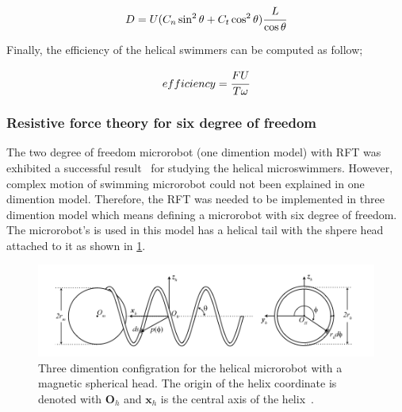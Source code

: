 \documentclass[12pt,a4paper,titlepage]{report}
\begin{document}
\begin{equation}
 D = U (C_n \sin ^2 \theta + C_t \cos ^2 \theta) \cfrac{L}{\cos \theta} 
\label{drag}
\end{equation}



Finally, the efficiency of the helical swimmers can be computed as follow;



\begin{equation}
 efficiency = \cfrac{FU}{T \omega} 
\label{efficiency}
\end{equation}

 
\subsubsection{Resistive force theory for six degree of freedom}\label{RFT_sixDegree}
 



The two degree of freedom microrobot (one dimention model) with \ac*{RFT} was exhibited a successful result~\citep{mahoney2011velocity}
for studying the helical microswimmers. However, complex motion of swimming microrobot could not been 
explained in one dimention model. Therefore, the \ac*{RFT} was needed to be implemented in three dimention
model which means defining a microrobot with six degree of freedom. The microrobot\rq{}s is
used in this model has a helical tail with the shpere head attached to it as shown in \ref{RFT-6dof}.

\begin{figure}
  \centering
    \includegraphics[width=1.0\textwidth]{RFT-6dof}
  \caption{Three dimention configration for the helical microrobot with a magnetic spherical head. The origin
of the helix coordinate is denoted with $\bm{O}_h$ and $\bm{x}_{h}$ is the central axis of the
 helix~\citep{mahoney2011velocity}.}
  \label{RFT-6dof}
\end{figure}
\end{document}
